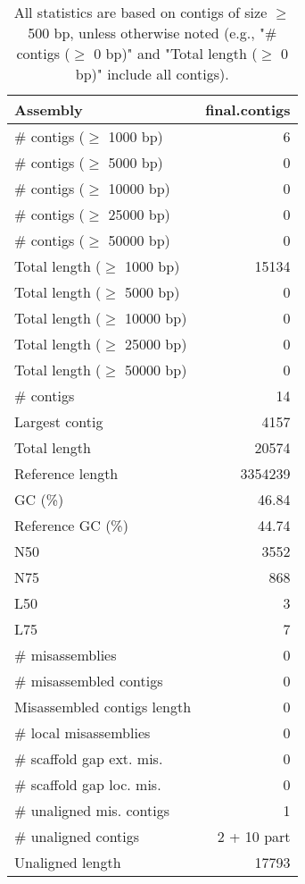 \documentclass[12pt,a4paper]{article}
\begin{document}
\begin{table}[ht]
\begin{center}
\caption{All statistics are based on contigs of size $\geq$ 500 bp, unless otherwise noted (e.g., "\# contigs ($\geq$ 0 bp)" and "Total length ($\geq$ 0 bp)" include all contigs).}
\begin{tabular}{|l*{1}{|r}|}
\hline
Assembly & final.contigs \\ \hline
\# contigs ($\geq$ 1000 bp) & 6 \\ \hline
\# contigs ($\geq$ 5000 bp) & 0 \\ \hline
\# contigs ($\geq$ 10000 bp) & 0 \\ \hline
\# contigs ($\geq$ 25000 bp) & 0 \\ \hline
\# contigs ($\geq$ 50000 bp) & 0 \\ \hline
Total length ($\geq$ 1000 bp) & 15134 \\ \hline
Total length ($\geq$ 5000 bp) & 0 \\ \hline
Total length ($\geq$ 10000 bp) & 0 \\ \hline
Total length ($\geq$ 25000 bp) & 0 \\ \hline
Total length ($\geq$ 50000 bp) & 0 \\ \hline
\# contigs & 14 \\ \hline
Largest contig & 4157 \\ \hline
Total length & 20574 \\ \hline
Reference length & 3354239 \\ \hline
GC (\%) & 46.84 \\ \hline
Reference GC (\%) & 44.74 \\ \hline
N50 & 3552 \\ \hline
N75 & 868 \\ \hline
L50 & 3 \\ \hline
L75 & 7 \\ \hline
\# misassemblies & 0 \\ \hline
\# misassembled contigs & 0 \\ \hline
Misassembled contigs length & 0 \\ \hline
\# local misassemblies & 0 \\ \hline
\# scaffold gap ext. mis. & 0 \\ \hline
\# scaffold gap loc. mis. & 0 \\ \hline
\# unaligned mis. contigs & 1 \\ \hline
\# unaligned contigs & 2 + 10 part \\ \hline
Unaligned length & 17793 \\ \hline

\end{tabular}
\end{center}
\end{table}
\end{document}
